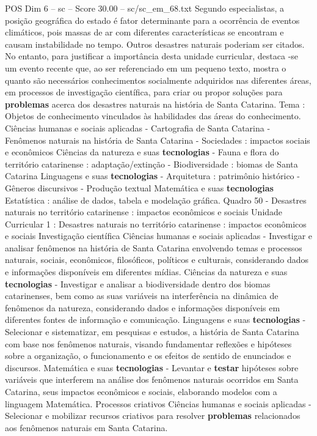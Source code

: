 \begin{textsample}{POS Dim 6 – sc – Score 30.00 – sc/sc\_em\_68.txt}
Segundo especialistas, a posição geográfica do estado é fator determinante para a ocorrência de eventos climáticos, pois massas de ar com diferentes características se encontram e causam instabilidade no tempo.
Outros desastres naturais poderiam ser citados.
No entanto, para justificar a importância desta unidade curricular, destaca -se um evento recente que, ao ser referenciado em um pequeno texto, mostra o quanto são necessários conhecimentos socialmente adquiridos nas diferentes áreas, em processos de investigação científica, para criar ou propor soluções para \textbf{problemas} acerca dos desastres naturais na história de Santa Catarina.
Tema : Objetos de conhecimento vinculados às habilidades das áreas do conhecimento.
Ciências humanas e sociais aplicadas - Cartografia de Santa Catarina - Fenômenos naturais na história de Santa Catarina - Sociedades : impactos sociais e econômicos Ciências da natureza e suas \textbf{tecnologias} - Fauna e flora do território catarinense : adaptação/extinção - Biodiversidade : biomas de Santa Catarina Linguagens e suas \textbf{tecnologias} - Arquitetura : patrimônio histórico - Gêneros discursivos - Produção textual Matemática e suas \textbf{tecnologias} Estatística : análise de dados, tabela e modelação gráfica.
Quadro 50 - Desastres naturais no território catarinense : impactos econômicos e sociais Unidade Curricular 1 : Desastres naturais no território catarinense : impactos econômicos e sociais Investigação científica Ciências humanas e sociais aplicadas - Investigar e analisar fenômenos na história de Santa Catarina envolvendo temas e processos naturais, sociais, econômicos, filosóficos, políticos e culturais, considerando dados e informações disponíveis em diferentes mídias.
Ciências da natureza e suas \textbf{tecnologias} - Investigar e analisar a biodiversidade dentro dos biomas catarinenses, bem como as suas variáveis na interferência na dinâmica de fenômenos da natureza, considerando dados e informações disponíveis em diferentes fontes de informação e comunicação.
Linguagens e suas \textbf{tecnologias} - Selecionar e sistematizar, em pesquisas e estudos, a história de Santa Catarina com base nos fenômenos naturais, visando fundamentar reflexões e hipóteses sobre a organização, o funcionamento e os efeitos de sentido de enunciados e discursos.
Matemática e suas \textbf{tecnologias} - Levantar e \textbf{testar} hipóteses sobre variáveis que interferem na análise dos fenômenos naturais ocorridos em Santa Catarina, seus impactos econômicos e sociais, elaborando modelos com a linguagem Matemática.
Processos criativos Ciências humanas e sociais aplicadas - Selecionar e mobilizar recursos criativos para resolver \textbf{problemas} relacionados aos fenômenos naturais em Santa Catarina.

\end{textsample}
